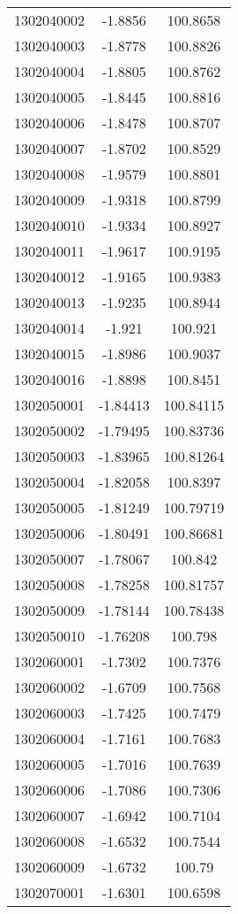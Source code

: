 \begin{longtable}{@{}lcc@{}}
1302040002 & -1.8856 & 100.8658\\ 
1302040003 & -1.8778 & 100.8826\\ 
1302040004 & -1.8805 & 100.8762\\ 
1302040005 & -1.8445 & 100.8816\\ 
1302040006 & -1.8478 & 100.8707\\ 
1302040007 & -1.8702 & 100.8529\\ 
1302040008 & -1.9579 & 100.8801\\ 
1302040009 & -1.9318 & 100.8799\\ 
1302040010 & -1.9334 & 100.8927\\ 
1302040011 & -1.9617 & 100.9195\\ 
1302040012 & -1.9165 & 100.9383\\ 
1302040013 & -1.9235 & 100.8944\\ 
1302040014 & -1.921 & 100.921\\ 
1302040015 & -1.8986 & 100.9037\\ 
1302040016 & -1.8898 & 100.8451\\ 
1302050001 & -1.84413 & 100.84115\\ 
1302050002 & -1.79495 & 100.83736\\ 
1302050003 & -1.83965 & 100.81264\\ 
1302050004 & -1.82058 & 100.8397\\ 
1302050005 & -1.81249 & 100.79719\\ 
1302050006 & -1.80491 & 100.86681\\ 
1302050007 & -1.78067 & 100.842\\ 
1302050008 & -1.78258 & 100.81757\\ 
1302050009 & -1.78144 & 100.78438\\ 
1302050010 & -1.76208 & 100.798\\ 
1302060001 & -1.7302 & 100.7376\\ 
1302060002 & -1.6709 & 100.7568\\ 
1302060003 & -1.7425 & 100.7479\\ 
1302060004 & -1.7161 & 100.7683\\ 
1302060005 & -1.7016 & 100.7639\\ 
1302060006 & -1.7086 & 100.7306\\ 
1302060007 & -1.6942 & 100.7104\\ 
1302060008 & -1.6532 & 100.7544\\ 
1302060009 & -1.6732 & 100.79\\ 
1302070001 & -1.6301 & 100.6598\\ 

\end{longtable}
